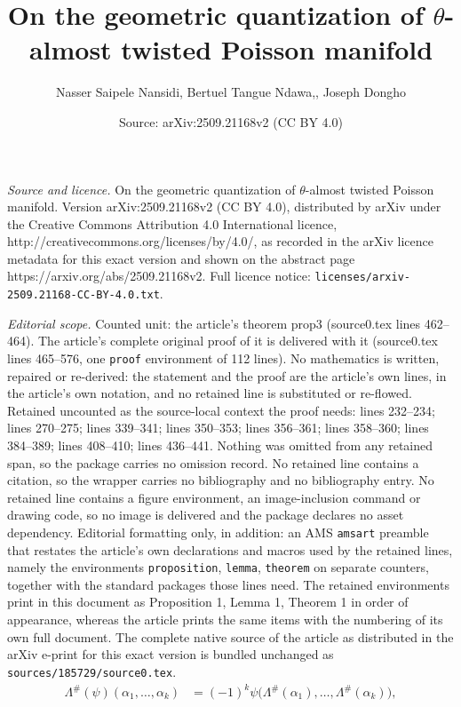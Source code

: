 \documentclass[10pt,a4paper]{amsart}
\title{On the geometric quantization of $\theta$-almost twisted Poisson manifold}
\author{Nasser Saipele Nansidi, Bertuel Tangue Ndawa,, Joseph Dongho}
\date{Source: arXiv:2509.21168v2 (CC BY 4.0)}
\begin{document}
\maketitle

\noindent\emph{Source and licence.} On the geometric quantization of $\theta$-almost twisted Poisson manifold. Version arXiv:2509.21168v2 (CC BY 4.0), distributed by arXiv under the Creative Commons Attribution 4.0 International licence, http://creativecommons.org/licenses/by/4.0/, as recorded in the arXiv licence metadata for this exact version and shown on the abstract page https://arxiv.org/abs/2509.21168v2. Full licence notice: \texttt{licenses/arxiv-2509.21168-CC-BY-4.0.txt}.\par\smallskip

\noindent\textit{Editorial scope.} Counted unit: the article's theorem prop3 (source0.tex lines 462--464). The article's complete original proof of it is delivered with it (source0.tex lines 465--576, one \texttt{proof} environment of 112 lines). No mathematics is written, repaired or re-derived: the statement and the proof are the article's own lines, in the article's own notation, and no retained line is substituted or re-flowed.  Retained uncounted as the source-local context the proof needs: lines 232--234; lines 270--275; lines 339--341; lines 350--353; lines 356--361; lines 358--360; lines 384--389; lines 408--410; lines 436--441.  Nothing was omitted from any retained span, so the package carries no omission record.  No retained line contains a citation, so the wrapper carries no bibliography and no bibliography entry.  No retained line contains a figure environment, an image-inclusion command or drawing code, so no image is delivered and the package declares no asset dependency.  Editorial formatting only, in addition: an AMS \texttt{amsart} preamble that restates the article's own declarations and macros used by the retained lines, namely the environments \texttt{proposition}, \texttt{lemma}, \texttt{theorem} on separate counters, together with the standard packages those lines need.  The retained environments print in this document as Proposition 1, Lemma 1, Theorem 1 in order of appearance, whereas the article prints the same items with the numbering of its own full document.  The complete native source of the article as distributed in the arXiv e-print for this exact version is bundled unchanged as \texttt{sources/185729/source0.tex}.
\begin{align}\label{Eq3}
	\Lambda^\#(\psi)(\alpha_1,\dots,\alpha_k) &= (-1)^{k}\psi\bigg(\Lambda^\#(\alpha_1),\dots,\Lambda^\#(\alpha_k)\bigg),
\end{align}
\end{document}

